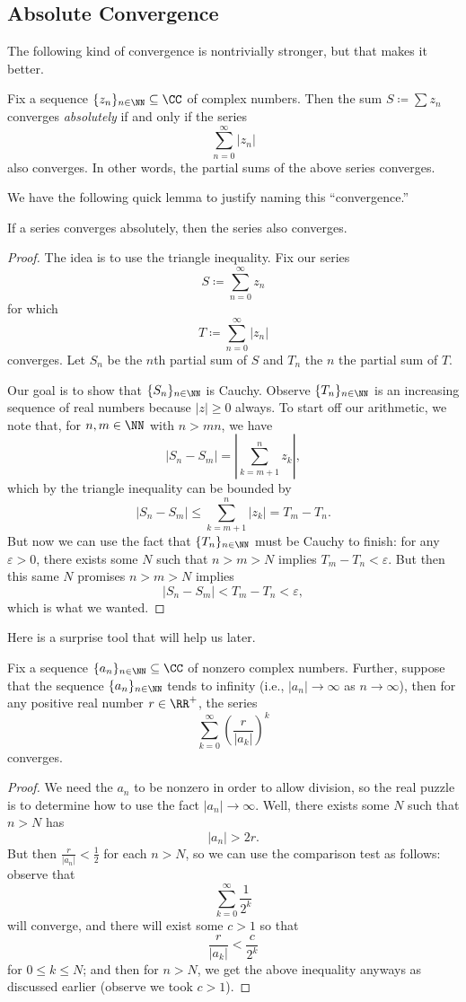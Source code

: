 \documentclass[../notes.tex]{subfiles}
\begin{document}
\subsection{Absolute Convergence}
The following kind of convergence is nontrivially stronger, but that makes it better.
\begin{definition}
	Fix a sequence $\{z_n\}_{n\in\NN}\subseteq\CC$ of complex numbers. Then the sum $S\coloneqq\sum z_n$ converges \textit{absolutely} if and only if the series
	\[\sum_{n=0}^\infty|z_n|\]
	also converges. In other words, the partial sums of the above series converges.
\end{definition}
We have the following quick lemma to justify naming this ``convergence.''
\begin{lemma}
	If a series converges absolutely, then the series also converges.
\end{lemma}
\begin{proof}
	The idea is to use the triangle inequality. Fix our series
	\[S\coloneqq\sum_{n=0}^\infty z_n\]
	for which
	\[T\coloneqq\sum_{n=0}^\infty|z_n|\]
	converges. Let $S_n$ be the $n$th partial sum of $S$ and $T_n$ the $n$ the partial sum of $T$.
	
	Our goal is to show that $\{S_n\}_{n\in\NN}$ is Cauchy. Observe $\{T_n\}_{n\in\NN}$ is an increasing sequence of real numbers because $|z|\ge0$ always. To start off our arithmetic, we note that, for $n,m\in\NN$ with $n>mn$, we have
	\[|S_n-S_m|=\left|\sum_{k=m+1}^nz_k\right|,\]
	which by the triangle inequality can be bounded by
	\[|S_n-S_m|\le\sum_{k=m+1}^n|z_k|=T_m-T_n.\]
	But now we can use the fact that $\{T_n\}_{n\in\NN}$ must be Cauchy to finish: for any $\varepsilon>0$, there exists some $N$ such that $n>m>N$ implies $T_m-T_n<\varepsilon$. But then this same $N$ promises $n>m>N$ implies
	\[|S_n-S_m|<T_m-T_n<\varepsilon,\]
	which is what we wanted.
\end{proof}
Here is a surprise tool that will help us later.
\begin{lemma}
	Fix a sequence $\{a_n\}_{n\in\NN}\subseteq\CC$ of nonzero complex numbers. Further, suppose that the sequence $\{a_n\}_{n\in\NN}$ tends to infinity (i.e., $|a_n|\to\infty$ as $n\to\infty$), then for any positive real number $r\in\RR^+$, the series
	\[\sum_{k=0}^\infty\left(\frac r{|a_k|}\right)^k\]
	converges.
\end{lemma}
\begin{proof}
	We need the $a_n$ to be nonzero in order to allow division, so the real puzzle is to determine how to use the fact $|a_n|\to\infty$. Well, there exists some $N$ such that $n>N$ has
	\[|a_n|>2r.\]
	But then $\frac r{|a_n|}<\frac12$ for each $n>N$, so we can use the comparison test as follows: observe that
	\[\sum_{k=0}^\infty\frac1{2^k}\]
	will converge, and there will exist some $c>1$ so that
	\[\frac r{|a_k|}<\frac c{2^k}\]
	for $0\le k\le N$; and then for $n>N$, we get the above inequality anyways as discussed earlier (observe we took $c>1$).
\end{proof}
\end{document}
